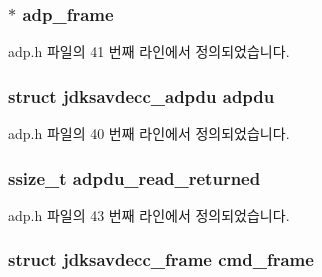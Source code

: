 \subsubsection[{\texorpdfstring{adp\+\_\+frame}{adp_frame}}]{$\ast$ adp\+\_\+frame\hspace{0.3cm}{\ttfamily [private]}}\hypertarget{classavdecc__lib_1_1adp_a81272560b45748ffdcb020bce0a97fcf}{}\label{classavdecc__lib_1_1adp_a81272560b45748ffdcb020bce0a97fcf}


adp.\+h 파일의 41 번째 라인에서 정의되었습니다.

\subsubsection[{\texorpdfstring{adpdu}{adpdu}}]{\setlength{\rightskip}{0pt plus 5cm}struct {\bf jdksavdecc\+\_\+adpdu} adpdu\hspace{0.3cm}{\ttfamily [private]}}\hypertarget{classavdecc__lib_1_1adp_a5beb497be6745a40437a0488a9882dec}{}\label{classavdecc__lib_1_1adp_a5beb497be6745a40437a0488a9882dec}


adp.\+h 파일의 40 번째 라인에서 정의되었습니다.

\subsubsection[{\texorpdfstring{adpdu\+\_\+read\+\_\+returned}{adpdu_read_returned}}]{\setlength{\rightskip}{0pt plus 5cm}ssize\+\_\+t adpdu\+\_\+read\+\_\+returned\hspace{0.3cm}{\ttfamily [private]}}\hypertarget{classavdecc__lib_1_1adp_ae5f7c6273394ddcde9df829406415cae}{}\label{classavdecc__lib_1_1adp_ae5f7c6273394ddcde9df829406415cae}


adp.\+h 파일의 43 번째 라인에서 정의되었습니다.

\subsubsection[{\texorpdfstring{cmd\+\_\+frame}{cmd_frame}}]{\setlength{\rightskip}{0pt plus 5cm}struct {\bf jdksavdecc\+\_\+frame} cmd\+\_\+frame\hspace{0.3cm}{\ttfamily [private]}}\hypertarget{classavdecc__lib_1_1adp_a88a6b7b79f4e053abd5803938d5fb6ee}{}\label{classavdecc__lib_1_1adp_a88a6b7b79f4e053abd5803938d5fb6ee}


